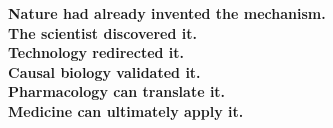 \documentclass[11pt]{article}
\begin{document}
\begin{tcolorbox}[colback=Maroon!5,colframe=Maroon,
  title=\textbf{Final Message},fonttitle=\bfseries]
\begin{center}
\Large
\textbf{
Nature had already invented the mechanism.\\[4pt]
The scientist discovered it.\\[4pt]
Technology redirected it.\\[4pt]
Causal biology validated it.\\[4pt]
Pharmacology can translate it.\\[4pt]
Medicine can ultimately apply it.
}
\end{center}
\end{tcolorbox}
\end{document}
